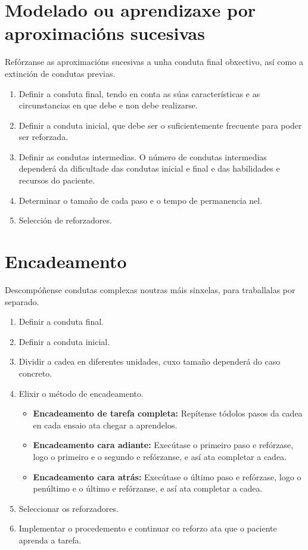 \documentclass[a4paper,11pt]{article}
\begin{document}
\section{Modelado ou aprendizaxe por aproximacións sucesivas}
Refórzanse as aproximacións sucesivas a unha conduta final obxectivo, así como a extinción de condutas previas.
\begin{enumerate}
	\item Definir a conduta final, tendo en conta as súas características e as circunstancias en 
	que debe e non debe realizarse. 
	\item Definir a conduta inicial, que debe ser o suficientemente frecuente para poder ser 
	reforzada.
	\item Definir as condutas intermedias. O número de condutas intermedias dependerá da dificultade 
	das condutas inicial e final e das habilidades e recursos do paciente.
	\item Determinar o tamaño de cada paso e o tempo de permanencia nel.
	\item Selección de reforzadores.
\end{enumerate}

\section{Encadeamento}
Descompóñense condutas complexas noutras máis sinxelas, para traballalas por separado. 
\begin{enumerate}
	\item Definir a conduta final.
	\item Definir a conduta inicial.
	\item Dividir a cadea en diferentes unidades, cuxo tamaño dependerá do caso concreto.
	\item Elixir o método de encadeamento.
	\begin{itemize}
		\item \textbf{Encadeamento de tarefa completa:} Repítense tódolos pasos da cadea en cada 
		ensaio ata chegar a aprendelos.
		\item \textbf{Encadeamento cara adiante:} Execútase o primeiro paso e refórzase, logo o 
		primeiro e o segundo e refórzanse, e así ata completar a cadea.
		\item \textbf{Encadeamento cara atrás:} Execútase o último paso e refórzase, logo o 
		penúltimo e o último e refórzanse, e así ata completar a cadea.
	\end{itemize}
	\item Seleccionar os reforzadores.
	\item Implementar o procedemento e continuar co reforzo ata que o paciente aprenda a tarefa. 
\end{enumerate}
\end{document}
